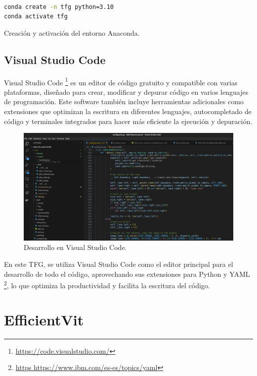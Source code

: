\begin{code}[h]
\begin{lstlisting}[language=bash]

conda create -n tfg python=3.10
conda activate tfg

\end{lstlisting}
\caption[Creación del entorno Anaconda]{Creación y activación del entorno Anaconda.}
\label{cod:anaconda}
\end{code}

\subsection{Visual Studio Code}
\label{sec:vs_code}

Visual Studio Code \footnote{\url{https://code.visualstudio.com/}} es un editor de código gratuito y compatible con varias plataformas, diseñado para crear, modificar y depurar código en varios lenguajes de programación. Este software también incluye herramientas adicionales como extensiones que optimizan la escritura en diferentes lenguajes, autocompletado de código y terminales integrados para hacer más eficiente la ejecución y depuración.

\begin{figure}[ht]
  \begin{center}
    \includegraphics[width=12cm]{figs/Plataformas_Desarollo/visual_code.png}
  \end{center}
  \caption{Desarrollo en Visual Studio Code.}
  \label{foto_code}
\end{figure}

En este \ac{TFG}, se utiliza Visual Studio Code como el editor principal para el desarrollo de todo el código, aprovechando sus extensiones para Python y YAML \footnote{\url{https https://www.ibm.com/es-es/topics/yaml}}, lo que optimiza la productividad y facilita la escritura del código.

\section{EfficientVit}
\label{sec:ef}

